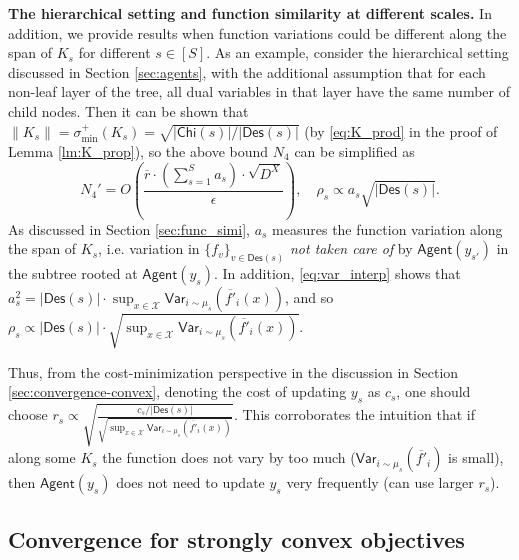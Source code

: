 \documentclass[10pt]{article}
\newcommand{\mc}{\mathcal}
\newcommand{\var}{\mathsf{Var}}
\newcommand{\agent}{\mathsf{Agent}}
\newcommand{\child}{\mathsf{Chi}}
\newcommand{\Descendant}{\mathsf{Des}}
\begin{document}


\textbf{The hierarchical setting and function similarity at different scales.}
In addition, we provide results when function variations could be different along the span of $K_s$ for different $s\in [S]$. As an example, consider the hierarchical setting discussed in Section \ref{sec:agents}, with the additional assumption that for each non-leaf layer of the tree, all dual variables in that layer have the same number of child nodes. Then it can be shown that $\|K_s\|=\sigma_{\min}^+(K_s) = \sqrt{|\child(s)|/|\Descendant(s)|}$ (by \eqref{eq:K_prod} in the proof of Lemma \ref{lm:K_prop}), so the above bound $N_4$ can be simplified as
\begin{displaymath}
    N_4'=O( \frac{\overline{r}\cdot (\sum_{s=1}^S a_s)\cdot \sqrt{D^X}}{\epsilon }),\quad \rho_s\propto a_s\sqrt{|\Descendant(s)|}.
\end{displaymath}
As discussed in Section \ref{sec:func_simi}, $a_s$ measures the function variation along the span of $K_s$, i.e. variation in $\{f_v\}_{v\in \Descendant(s)}$ \textit{not taken care of} by $\agent(y_{s'})$ in the subtree rooted at $\agent(y_s)$. In addition, \eqref{eq:var_interp} shows that $a_s^2 =  |\Descendant(s)| \cdot \sup_{x\in \mc X}\var_{i\sim \mu_s}(\overline{f'}_i(x))$, and so $\rho_s\propto |\Descendant(s)| \cdot \sqrt{\sup_{x\in \mc X}\var_{i\sim \mu_s}(\overline{f'}_i(x))}$. 

Thus, from the cost-minimization perspective in the discussion in Section \ref{sec:convergence-convex}, denoting the cost of updating $y_s$ as $c_s$, one should choose $r_s\propto\sqrt{\frac{c_s/|\Descendant(s)|}{\sqrt{\sup_{x\in \mc X}\var_{i\sim \mu_s}(\overline{f'}_i(x))}}}$. This corroborates the intuition that if along some $K_s$ the function does not vary by too much ($\var_{i\sim \mu_s}(\overline{f'}_i)$ is small), then $\agent(y_s)$ does not need to update $y_s$ very frequently (can use larger $r_s$).








\subsection{Convergence for strongly convex objectives}\label{sec:do-convergence-acc}
\end{document}
